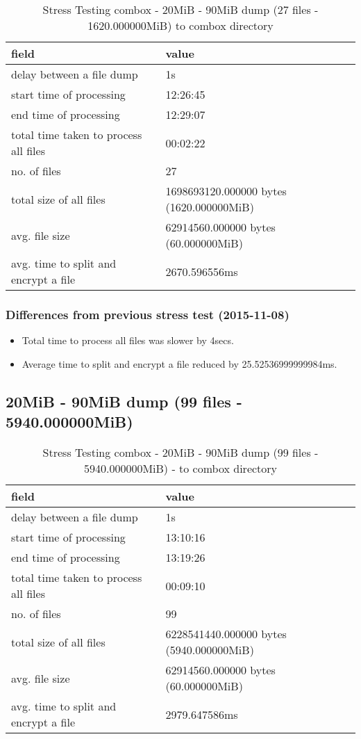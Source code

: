 \begin{center}
\begin{table}[h]
\begin{tabular}{ll}
field & value\\
\hline
delay between a file dump & 1s\\
start time of processing & 12:26:45\\
end time of processing & 12:29:07\\
total time taken to process all files & 00:02:22\\
no. of files & 27\\
total size of all files & 1698693120.000000 bytes (1620.000000MiB)\\
avg. file size & 62914560.000000 bytes (60.000000MiB)\\
avg. time to split and encrypt a file & 2670.596556ms\\
\end{tabular}
\caption{Stress Testing combox - 20MiB - 90MiB dump (27 files - 1620.000000MiB) to combox directory}
\end{table}
\end{center}

\subsubsection{Differences from previous stress test (2015-11-08)}

\begin{itemize}
\item Total time to process all files was slower by 4secs.
\item Average time to split and encrypt a file reduced by
   25.52536999999984ms.
\end{itemize}

\subsection{20MiB - 90MiB dump (99 files - 5940.000000MiB)}\label{4-st-5940}

\begin{center}
\begin{table}[h]
\begin{tabular}{ll}
field & value\\
\hline
delay between a file dump & 1s\\
start time of processing & 13:10:16\\
end time of processing & 13:19:26\\
total time taken to process all files & 00:09:10\\
no. of files & 99\\
total size of all files & 6228541440.000000 bytes (5940.000000MiB)\\
avg. file size & 62914560.000000 bytes (60.000000MiB)\\
avg. time to split and encrypt a file & 2979.647586ms\\
\end{tabular}
\caption{Stress Testing combox - 20MiB - 90MiB dump (99 files - 5940.000000MiB) - to combox directory}
\end{table}
\end{center}

